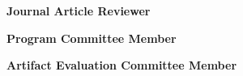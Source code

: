 
\begin{scholarship}
	{\textbf{Journal Article Reviewer}}

	{\textbf{Program Committee Member}}

	{\textbf{Artifact Evaluation Committee Member}}

\end{scholarship}
